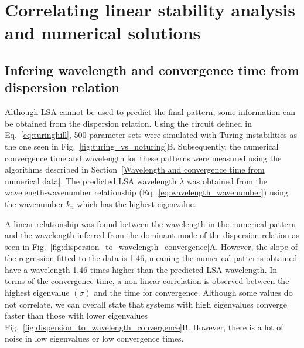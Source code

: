 \section{Correlating linear stability analysis and numerical solutions}
\subsection{Infering wavelength and convergence time from dispersion relation}
Although LSA cannot be used to predict the final pattern, some information can be obtained from the dispersion relation.
Using the circuit defined in Eq.~\ref{eq:turinghill}, 500 parameter sets were simulated with Turing instabilities as the one seen in Fig.~\ref{fig:turing_vs_noturing}B. Subsequently, the numerical convergence time and wavelength for these patterns were measured using the algorithms described in Section~\ref{Wavelength and convergence time from numerical data}.
The predicted LSA wavelength $\lambda$ was obtained from the wavelength-wavenumber relationship (Eq.~\ref{eq:wavelength_wavenumber}) using the wavenumber $k_{n}$ which has the highest eigenvalue.

A linear relationship was found between the wavelength in the numerical pattern and the wavelength inferred from the dominant mode of the dispersion relation as seen in Fig.~\ref{fig:dispersion_to_wavelength_convergence}A. However, the slope of the regression fitted to the data is 1.46, meaning the numerical patterns obtained have a wavelength 1.46 times higher than the predicted LSA wavelength.
In terms of the convergence time, a non-linear correlation is observed between the highest eigenvalue $(\sigma)$ and the time for convergence.
Although some values do not correlate, we can overall state that systems with high eigenvalues converge faster than those with lower eigenvalues Fig.~\ref{fig:dispersion_to_wavelength_convergence}B.
However, there is a lot of noise in low eigenvalues or low convergence times.


